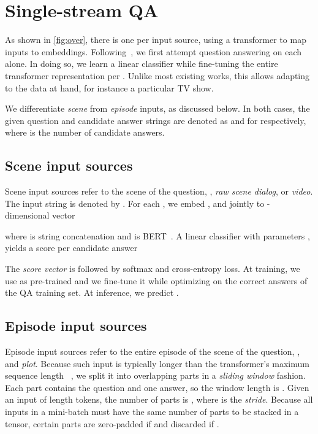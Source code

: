 \documentclass[10pt,twocolumn,letterpaper]{article}
\begin{document}
 \section{Single-stream QA}
\label{sec:stream}

As shown in \autoref{fig:over}, there is one \branch per input source, using a transformer to map inputs to embeddings. Following~\cite{garcia2020knowledge}, we first attempt question answering on each \branch alone. In doing so, we learn a linear classifier while fine-tuning the entire transformer representation per \branch. Unlike most existing works, this allows adapting to the data at hand, for instance a particular TV show.

We differentiate \emph{scene} from \emph{episode} inputs, as discussed below. In both cases, the given question and candidate answer strings are denoted as  and  for  respectively, where  is the number of candidate answers.



\subsection{Scene input sources}
\label{sec:short}

Scene input sources refer to the scene of the question, \ie, \emph{raw scene dialog}, \emph{\sceneSum} or \emph{video}. The input string is denoted by . For each , we embed ,  and  jointly to -dimensional vector

where  is string concatenation and  is BERT~. A linear classifier with parameters ,  yields a score per candidate answer

The \emph{score vector}  is followed by softmax and cross-entropy loss. At training, we use  as  pre-trained and we fine-tune it while optimizing  on the correct answers of the QA training set. At inference, we predict .



\subsection{Episode input sources}
\label{sec:long}

Episode input sources refer to the entire episode of the scene of the question, \ie, \emph{\episodeSum} and \emph{plot}. Because such input is typically longer than the transformer's maximum sequence length ~, we split it into overlapping parts in a \emph{sliding window} fashion. Each part contains the question and one answer, so the window length is . Given an input of length  tokens, the number of parts is , where  is the \emph{stride}. Because all inputs in a mini-batch must have the same number of parts  to be stacked in a tensor, certain parts are zero-padded if  and discarded if .
\end{document}

